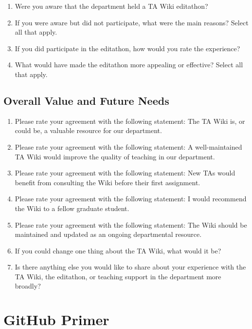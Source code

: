 \documentclass[11pt]{article}
\begin{document}
\begin{enumerate}
  \item Were you aware that the department held a TA Wiki editathon?
  \item If you were aware but did not participate, what were the main reasons? Select all that apply.
  \item If you did participate in the editathon, how would you rate the experience?
  \item What would have made the editathon more appealing or effective? Select all that apply.
\end{enumerate}

\subsection{Overall Value and Future Needs}

\begin{enumerate}
  \item Please rate your agreement with the following statement: The TA Wiki is, or could be, a valuable resource for our department.
  \item Please rate your agreement with the following statement: A well-maintained TA Wiki would improve the quality of teaching in our department.
  \item Please rate your agreement with the following statement: New TAs would benefit from consulting the Wiki before their first assignment.
  \item Please rate your agreement with the following statement: I would recommend the Wiki to a fellow graduate student.
  \item Please rate your agreement with the following statement: The Wiki should be maintained and updated as an ongoing departmental resource.
  \item If you could change one thing about the TA Wiki, what would it be?
  \item Is there anything else you would like to share about your experience with the TA Wiki, the editathon, or teaching support in the department more broadly?
\end{enumerate}

\section{GitHub Primer}
\end{document}

